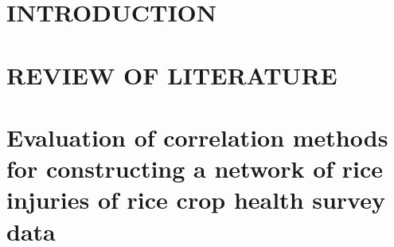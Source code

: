 \documentclass[12pt, oneside]{report} %
\begin{document}
\cleardoublepage

\pagestyle{myplain}

\chapter{INTRODUCTION}


\chapter{REVIEW OF LITERATURE}


\chapter{Evaluation of correlation methods for constructing a network of rice injuries of rice crop health survey data}






\cleardoublepage
\begin{singlespace}
\renewcommand{\bibname}{LITERATURE CITED}

\end{singlespace}
\end{document}
